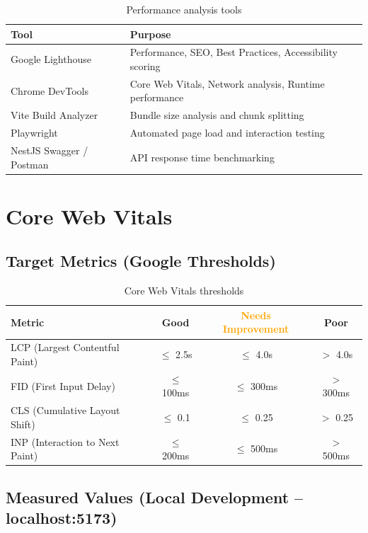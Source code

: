 \documentclass[12pt,a4paper]{article}
\begin{document}
\begin{table}[H]
\centering
\begin{tabularx}{\textwidth}{lX}
\toprule
\textbf{Tool} & \textbf{Purpose} \\
\midrule
Google Lighthouse        & Performance, SEO, Best Practices, Accessibility scoring \\
Chrome DevTools          & Core Web Vitals, Network analysis, Runtime performance \\
Vite Build Analyzer      & Bundle size analysis and chunk splitting \\
Playwright               & Automated page load and interaction testing \\
NestJS Swagger / Postman & API response time benchmarking \\
\bottomrule
\end{tabularx}
\caption{Performance analysis tools}
\end{table}

\section{Core Web Vitals}

\subsection{Target Metrics (Google Thresholds)}

\begin{table}[H]
\centering
\begin{tabular}{lccc}
\toprule
\textbf{Metric} & \textbf{\textcolor{goodgreen}{Good}} & \textbf{\textcolor{orange}{Needs Improvement}} & \textbf{\textcolor{warnred}{Poor}} \\
\midrule
LCP (Largest Contentful Paint) & $\leq$ 2.5s & $\leq$ 4.0s & $>$ 4.0s \\
FID (First Input Delay)        & $\leq$ 100ms & $\leq$ 300ms & $>$ 300ms \\
CLS (Cumulative Layout Shift)  & $\leq$ 0.1 & $\leq$ 0.25 & $>$ 0.25 \\
INP (Interaction to Next Paint)& $\leq$ 200ms & $\leq$ 500ms & $>$ 500ms \\
\bottomrule
\end{tabular}
\caption{Core Web Vitals thresholds}
\end{table}

\subsection{Measured Values (Local Development -- localhost:5173)}
\end{document}
